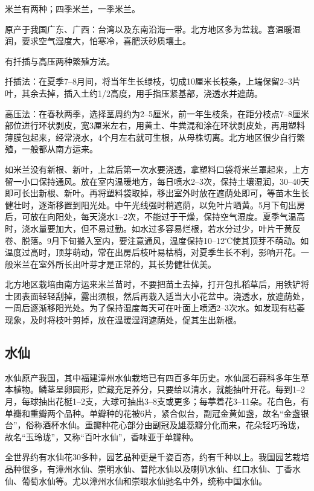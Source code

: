 \documentclass{ctexbook}
\begin{document}
米兰有两种；四季米兰，一季米兰。

原产于我国广东、广西：台湾以及东南沿海一带。北方地区多为盆栽。喜温暖湿润，要求空气湿度大，怕寒冷，喜肥沃砂质壤土。

有扦插与高压两种繁殖方法。

扦插法：在夏季7--8月间，将当年生长绿枝，切成10厘米长枝条，上端保留2--3片叶，其余去掉，插入土约1/2高度，用手指压紧基部，浇透水并遮荫。

高压法：在春秋两季，选择茎周约为2--5厘米，前一年生枝条，在距分枝点7--8厘米部位进行环状剥皮，宽3厘米左右，用黄土、牛粪混和涂在环状剥皮处，再用塑料薄膜包起来，经常浇水，4个月左右就可生根，从母株切离。北方地区很少自行繁殖，一般都从南方运来。

如米兰没有新根、新叶，上盆后第一次水要浇透，拿塑料口袋将米兰罩起来，上方留一小口保持通风。放在室内温暖地方，每日喷水2--3次，保持土壤湿润，30--40天即可长出新根、新叶。再将塑料袋取掉，移出室外时放在遮荫处即可，等苗木生长健壮时，逐渐移置到阳光处。中午光线强时稍遮荫，以免叶片晒黄。5月下旬出房后，可放在向阳处，每天浇水1--2次，不能过于干燥，保持空气湿度。夏季气温高时，浇水量要加大，但不易过勤。如水过多容易烂根，若水分过少，叶片干黄反卷、脱落。9月下旬搬入室内，要注意通风，温度保持10--12℃使其顶芽不萌动。如温度过高时，顶芽萌动，常在出房后枝叶易枯梢，对夏季生长不利，影响开花。一般米兰在室外所长出叶芽才是正常的，其长势健壮优美。

北方地区栽培由南方运来米兰苗时，不要把苗土去掉，打开包扎稻草后，用铁铲将士团表面轻轻刮掉，露出须根，然后再栽入适当大小花盆中。浇透水，放遮荫处，一周后逐渐移阳光处。为了保持湿度每天可在叶面上喷洒2--3次水。如发现有枯萎现象，及时将枝叶剪掉，放在温暖湿润遮荫处，促其生出新根。

\subsection{水仙}
水仙原产我国，其中福建漳州水仙栽培已有四百多年历史。水仙属石蒜科多年生草本植物。鳞茎呈卵圆形，贮藏充足养分，只要给以清水，就能抽叶开花。每到1--2月，每球抽出花梃1--2支，大球可抽出3--8支或更多；每葶着花3--11朵。花白色，有单瓣和重瓣两个品种。单瓣种的花被6片，紧合似台，副冠金黄如盏，故名“金盏银台”，俗称酒杯水仙。重瓣种花心部分由副冠及雄蕊瓣分化而来，花朵轻巧玲珑，故名“玉玲珑”，又称“百叶水仙”，香味亚于单瓣种。

全世界约有水仙花30多种，园艺品种更是千姿百态，约有千种以上。我国园艺栽培品种很多，有漳州水仙、崇明水仙、普陀水仙以及喇叭水仙、红口水仙、丁香水仙、葡萄水仙等。尤以漳州水仙和崇眼水仙驰名中外，统称中国水仙。
\end{document}
